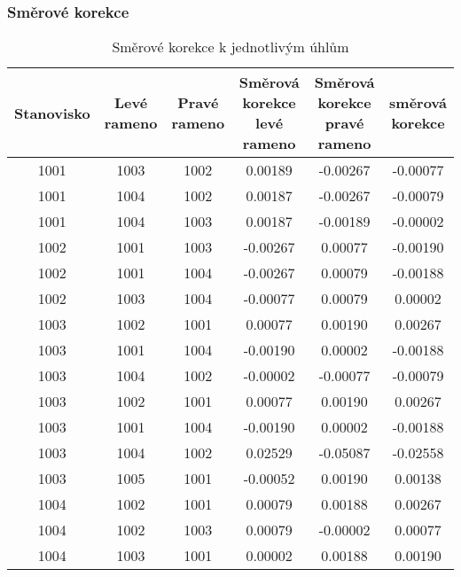 \subsubsection{Směrové korekce}
\begin{table}[H]
    \centering
    \caption{Směrové korekce k jednotlivým úhlům}
    \begin{tabular}{|c|c|c||c|c|c|}
        \hline
        \textbf{Stanovisko} & \makecell{\textbf{Levé}\\\textbf{rameno}} & \makecell{\textbf{Pravé}\\\textbf{rameno}} & \makecell{\textbf{Směrová korekce}\\\textbf{levé rameno}} & \makecell{\textbf{Směrová korekce}\\\textbf{pravé rameno}} & \makecell{\textbf{směrová}\\\textbf{korekce}} \\
        \hline\hline
        1001 & 1003 & 1002 & 0.00189 & -0.00267 & -0.00077 \\
        1001 & 1004 & 1002 & 0.00187 & -0.00267 & -0.00079 \\
        1001 & 1004 & 1003 & 0.00187 & -0.00189 & -0.00002 \\
        \hline
        1002 & 1001 & 1003 & -0.00267 & 0.00077 & -0.00190 \\
        1002 & 1001 & 1004 & -0.00267 & 0.00079 & -0.00188 \\
        1002 & 1003 & 1004 & -0.00077 & 0.00079 & 0.00002 \\
        \hline
        1003 & 1002 & 1001 & 0.00077 & 0.00190 & 0.00267 \\
        1003 & 1001 & 1004 & -0.00190 & 0.00002 & -0.00188 \\
        1003 & 1004 & 1002 & -0.00002 & -0.00077 & -0.00079 \\
        1003 & 1002 & 1001 & 0.00077 & 0.00190 & 0.00267 \\
        1003 & 1001 & 1004 & -0.00190 & 0.00002 & -0.00188 \\
        1003 & 1004 & 1002 & 0.02529 & -0.05087 & -0.02558 \\
        1003 & 1005 & 1001 & -0.00052 & 0.00190 & 0.00138 \\
        \hline
        1004 & 1002 & 1001 & 0.00079 & 0.00188 & 0.00267 \\
        1004 & 1002 & 1003 & 0.00079 & -0.00002 & 0.00077 \\
        1004 & 1003 & 1001 & 0.00002 & 0.00188 & 0.00190 \\
        \hline
    \end{tabular}
\end{table}

